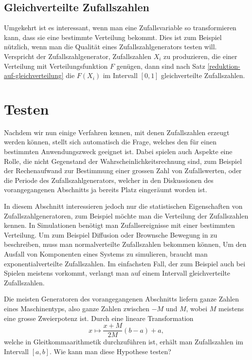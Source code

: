 \subsection{Gleichverteilte Zufallszahlen} \label{gleichverteilte-zufallszahlen}
Umgekehrt ist es interessant, wenn man eine Zufallsvariable so transformieren
kann, dass sie eine bestimmte Verteilung bekommt.
Dies ist zum 
Beispiel nützlich, wenn man die Qualität eines Zufallszahlgenerators
testen will.
Verspricht der Zufallszahlgenerator, Zufallszahlen $X_i$ zu
produzieren, die einer Verteilung mit Verteilungsfunktion $F$
genügen, dann sind nach Satz \ref{reduktion-auf-gleichverteilung} die
$F(X_i)$ im Intervall $[0,1]$ gleichverteilte Zufallszahlen.

\section{Testen}
Nachdem wir nun einige Verfahren kennen, mit denen Zufallszahlen
erzeugt werden können, stellt sich automatisch die Frage, welches
den für einen bestimmten Anwendungszweck geeignet ist.
Dabei spielen auch Aspekte eine Rolle, die nicht Gegenstand der
Wahrscheinlichkeitsrechnung sind, zum Beispiel der Rechenaufwand
zur Bestimmung einer grossen Zahl von Zufallswerten, oder die Periode
des Zufallszahlgenerators, welcher in den Diskussionen des vorangegangenen
Abschnitts ja bereits Platz eingeräumt worden ist.

In diesem Abschnitt interessieren jedoch nur die statistischen Eigenschaften
von Zufallszahlgeneratoren, zum Beispiel möchte man die Verteilung
der Zufallszahlen kennen.
In Simulationen benötigt man Zufallsereignisse mit einer bestimmten
Verteilung.
Um zum Beispiel Diffusion oder Brownsche Bewegung in
zu beschreiben, muss man normalverteilte Zufallszahlen bekommen
können, Um den Ausfall von Komponenten eines Systems zu simulieren,
braucht man exponentialverteilte Zufallszahlen.
Im einfachsten Fall,
der zum Beispiel auch bei Spielen meistens vorkommt, verlangt man
auf einem Intervall gleichverteilte Zufallszahlen.

Die meisten Generatoren des vorangegangenen Abschnitts
liefern ganze Zahlen eines Maschinentyps, also ganze Zahlen zwischen
$-M$ und $M$, wobei $M$ meistens eine grosse Zweierpotenz ist.
Durch eine lineare Transformation
\begin{equation}
x\mapsto \frac{x+M}{2M}(b-a) + a,
\end{equation}
welche in Gleitkommaarithmetik durchzuführen ist, erhält man
Zufallszahlen im Intervall $[a,b]$.
Wie kann man diese Hypothese testen?

